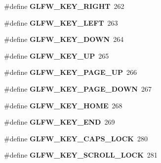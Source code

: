 \begin{DoxyCompactItemize}
\item 
\hypertarget{group__keys_ga06ba07662e8c291a4a84535379ffc7ac}{}\#define {\bfseries G\+L\+F\+W\+\_\+\+K\+E\+Y\+\_\+\+R\+I\+G\+H\+T}~262\label{group__keys_ga06ba07662e8c291a4a84535379ffc7ac}

\item 
\hypertarget{group__keys_gae12a010d33c309a67ab9460c51eb2462}{}\#define {\bfseries G\+L\+F\+W\+\_\+\+K\+E\+Y\+\_\+\+L\+E\+F\+T}~263\label{group__keys_gae12a010d33c309a67ab9460c51eb2462}

\item 
\hypertarget{group__keys_gae2e3958c71595607416aa7bf082be2f9}{}\#define {\bfseries G\+L\+F\+W\+\_\+\+K\+E\+Y\+\_\+\+D\+O\+W\+N}~264\label{group__keys_gae2e3958c71595607416aa7bf082be2f9}

\item 
\hypertarget{group__keys_ga2f3342b194020d3544c67e3506b6f144}{}\#define {\bfseries G\+L\+F\+W\+\_\+\+K\+E\+Y\+\_\+\+U\+P}~265\label{group__keys_ga2f3342b194020d3544c67e3506b6f144}

\item 
\hypertarget{group__keys_ga3ab731f9622f0db280178a5f3cc6d586}{}\#define {\bfseries G\+L\+F\+W\+\_\+\+K\+E\+Y\+\_\+\+P\+A\+G\+E\+\_\+\+U\+P}~266\label{group__keys_ga3ab731f9622f0db280178a5f3cc6d586}

\item 
\hypertarget{group__keys_gaee0a8fa442001cc2147812f84b59041c}{}\#define {\bfseries G\+L\+F\+W\+\_\+\+K\+E\+Y\+\_\+\+P\+A\+G\+E\+\_\+\+D\+O\+W\+N}~267\label{group__keys_gaee0a8fa442001cc2147812f84b59041c}

\item 
\hypertarget{group__keys_ga41452c7287195d481e43207318c126a7}{}\#define {\bfseries G\+L\+F\+W\+\_\+\+K\+E\+Y\+\_\+\+H\+O\+M\+E}~268\label{group__keys_ga41452c7287195d481e43207318c126a7}

\item 
\hypertarget{group__keys_ga86587ea1df19a65978d3e3b8439bedd9}{}\#define {\bfseries G\+L\+F\+W\+\_\+\+K\+E\+Y\+\_\+\+E\+N\+D}~269\label{group__keys_ga86587ea1df19a65978d3e3b8439bedd9}

\item 
\hypertarget{group__keys_ga92c1d2c9d63485f3d70f94f688d48672}{}\#define {\bfseries G\+L\+F\+W\+\_\+\+K\+E\+Y\+\_\+\+C\+A\+P\+S\+\_\+\+L\+O\+C\+K}~280\label{group__keys_ga92c1d2c9d63485f3d70f94f688d48672}

\item 
\hypertarget{group__keys_gaf622b63b9537f7084c2ab649b8365630}{}\#define {\bfseries G\+L\+F\+W\+\_\+\+K\+E\+Y\+\_\+\+S\+C\+R\+O\+L\+L\+\_\+\+L\+O\+C\+K}~281\label{group__keys_gaf622b63b9537f7084c2ab649b8365630}


\end{DoxyCompactItemize}
